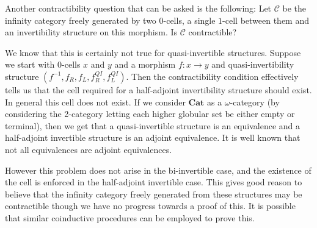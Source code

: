 \documentclass[draft]{article}
\newcommand{\inv}[1]{#1^{-1}} \newcommand{\comp}{\star}
\begin{document}
Another contractibility question that can be asked is the following:
Let \(\mathcal{C}\) be the infinity category freely generated by two
\(0\)-cells, a single \(1\)-cell between them and an invertibility
structure on this morphism. Is \(\mathcal{C}\) contractible?

We know that this is certainly not true for quasi-invertible
structures. Suppose we start with \(0\)-cells \(x\) and \(y\) and a
morphism \(f : x \to y\) and quasi-invertibility structure \((\inv f,
f_R, f_L, f_R^{QI}, f_L^{QI})\). Then the contractibility condition
effectively tells us that the cell required for a half-adjoint
invertibility structure should exist. In general this cell does not
exist. If we consider \(\mathbf{Cat}\) as a \(\omega\)-category (by
considering the 2-category letting each higher globular set be either
empty or terminal), then we get that a quasi-invertible structure is
an equivalence and a half-adjoint invertible structure is an adjoint
equivalence. It is well known that not all equivalences are adjoint
equivalences.

However this problem does not arise in the bi-invertible case, and the
existence of the cell is enforced in the half-adjoint invertible case.
This gives good reason to believe that the infinity category freely
generated from these structures may be contractible though we have no
progress towards a proof of this. It is possible that similar
coinductive procedures can be employed to prove this.



\printbibliography{}
\end{document}
